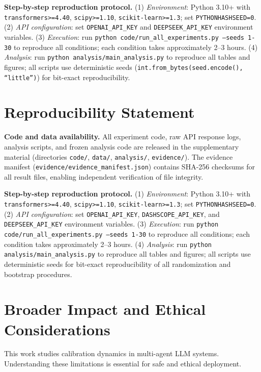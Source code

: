 \documentclass[11pt]{article}
\begin{document}
\textbf{Step-by-step reproduction protocol.} (1) \textit{Environment}: Python 3.10+ with \texttt{transformers>=4.40}, \texttt{scipy>=1.10}, \texttt{scikit-learn>=1.3}; set \texttt{PYTHONHASHSEED=0}. (2) \textit{API configuration}: set \texttt{OPENAI\_API\_KEY} and \texttt{DEEPSEEK\_API\_KEY} environment variables. (3) \textit{Execution}: run \texttt{python code/run\_all\_experiments.py --seeds 1-30} to reproduce all conditions; each condition takes approximately 2--3 hours. (4) \textit{Analysis}: run \texttt{python analysis/main\_analysis.py} to reproduce all tables and figures; all scripts use deterministic seeds (\texttt{int.from\_bytes(seed.encode(), ``little'')}) for bit-exact reproducibility.


\section*{Reproducibility Statement}
\label{sec:reproducibility}

\textbf{Code and data availability.} All experiment code, raw API response logs, analysis scripts, and frozen analysis code are released in the supplementary material (directories \texttt{code/}, \texttt{data/}, \texttt{analysis/}, \texttt{evidence/}). The evidence manifest (\texttt{evidence/evidence\_manifest.json}) contains SHA-256 checksums for all result files, enabling independent verification of file integrity.

\textbf{Step-by-step reproduction protocol.} (1) \textit{Environment}: Python 3.10+ with \texttt{transformers>=4.40}, \texttt{scipy>=1.10}, \texttt{scikit-learn>=1.3}; set \texttt{PYTHONHASHSEED=0}. (2) \textit{API configuration}: set \texttt{OPENAI\_API\_KEY}, \texttt{DASHSCOPE\_API\_KEY}, and \texttt{DEEPSEEK\_API\_KEY} environment variables. (3) \textit{Execution}: run \texttt{python code/run\_all\_experiments.py --seeds 1-30} to reproduce all conditions; each condition takes approximately 2--3 hours. (4) \textit{Analysis}: run \texttt{python analysis/main\_analysis.py} to reproduce all tables and figures; all scripts use deterministic seeds for bit-exact reproducibility of all randomization and bootstrap procedures.

\section*{Broader Impact and Ethical Considerations}
\label{sec:ethics}

This work studies calibration dynamics in multi-agent LLM systems. Understanding these limitations is essential for safe and ethical deployment.
\end{document}
